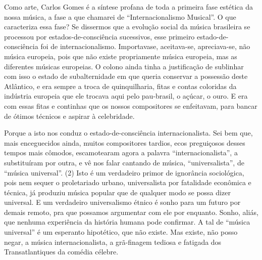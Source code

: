 Como arte, Carlos Gomes é a síntese profana de toda a primeira fase
estética da nossa música, a fase a que chamarei de ``Internacionalismo
Musical''. O que caracteriza essa fase? Se dissermos que a evolução
social da música brasileira se processou por estados-de-consciência
sucessivos, esse primeiro estado-de-consciência foi de
internacionalismo. Importavase, aceitava-se, apreciava-se, não música
europeia, pois que não existe propriamente música europeia, mas as
diferentes músicas europeias. O colono ainda tinha a justificação de
sublinhar com isso o estado de subalternidade em que queria conservar a
possessão deste Atlântico, e era sempre a troca de quinquilharia, fitas
e contas coloridas da indústria europeia que ele trocava aqui pelo
pau-brasil, o açúcar, o ouro. E era com essas fitas e continhas que os
nossos compositores se enfeitavam, para bancar de ótimos técnicos e
aspirar à celebridade.

Porque a isto nos conduz o estado-de-consciência internacionalista. Sei
bem que, mais enceguecidos ainda, muitos compositores tardios, ecos
preguiçosos desses tempos mais cômodos, escamotearam agora a palavra
``internacionalista'', a substituíram por outra, e vê nos falar cantando
de música, ``universalista'', de ``música universal''. (2) Isto é um
verdadeiro primor de ignorância sociológica, pois nem sequer o
proletariado urbano, universalista por fatalidade econômica e técnica,
já produziu música popular que de qualquer modo se possa dizer
universal. E um verdadeiro universalismo étnico é sonho para um futuro
por demais remoto, pra que possamos argumentar com ele por enquanto.
Sonho, aliás, que nenhuma experiência da história humana pode confirmar.
A tal de ``música universal'' é um esperanto hipotético, que não existe.
Mas existe, não posso negar, a música internacionalista, a grã-finagem
tediosa e fatigada dos Transatlantiques da comédia célebre.

